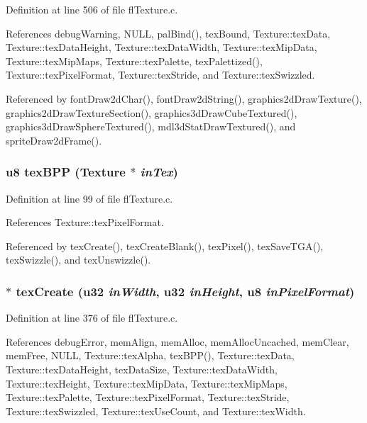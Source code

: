Definition at line 506 of file fl\-Texture.c.

References debug\-Warning, NULL, pal\-Bind(), tex\-Bound, Texture::tex\-Data, Texture::tex\-Data\-Height, Texture::tex\-Data\-Width, Texture::tex\-Mip\-Data, Texture::tex\-Mip\-Maps, Texture::tex\-Palette, tex\-Palettized(), Texture::tex\-Pixel\-Format, Texture::tex\-Stride, and Texture::tex\-Swizzled.

Referenced by font\-Draw2d\-Char(), font\-Draw2d\-String(), graphics2d\-Draw\-Texture(), graphics2d\-Draw\-Texture\-Section(), graphics3d\-Draw\-Cube\-Textured(), graphics3d\-Draw\-Sphere\-Textured(), mdl3d\-Stat\-Draw\-Textured(), and sprite\-Draw2d\-Frame().
\subsubsection{\setlength{\rightskip}{0pt plus 5cm}u8 tex\-BPP ({\bf Texture} $\ast$ {\em in\-Tex})\hspace{0.3cm}{\tt  [inline]}}\label{flTexture_8h_6190af1ad84f1a53b7383c16fd17b59b}




Definition at line 99 of file fl\-Texture.c.

References Texture::tex\-Pixel\-Format.

Referenced by tex\-Create(), tex\-Create\-Blank(), tex\-Pixel(), tex\-Save\-TGA(), tex\-Swizzle(), and tex\-Unswizzle().
\subsubsection{$\ast$ tex\-Create (u32 {\em in\-Width}, u32 {\em in\-Height}, u8 {\em in\-Pixel\-Format})}\label{flTexture_8h_4cdb1a72f4cf0008c2cbce4ce95c99e2}




Definition at line 376 of file fl\-Texture.c.

References debug\-Error, mem\-Align, mem\-Alloc, mem\-Alloc\-Uncached, mem\-Clear, mem\-Free, NULL, Texture::tex\-Alpha, tex\-BPP(), Texture::tex\-Data, Texture::tex\-Data\-Height, tex\-Data\-Size, Texture::tex\-Data\-Width, Texture::tex\-Height, Texture::tex\-Mip\-Data, Texture::tex\-Mip\-Maps, Texture::tex\-Palette, Texture::tex\-Pixel\-Format, Texture::tex\-Stride, Texture::tex\-Swizzled, Texture::tex\-Use\-Count, and Texture::tex\-Width.

